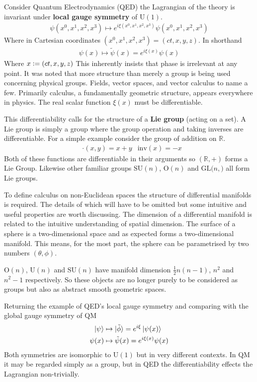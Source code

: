 Consider Quantum Electrodynamics (QED) the Lagrangian of the theory is invariant under \textbf{local gauge symmetry} of $\mathrm{U}(1)$.
\begin{align*}
\psi(x^0,x^1,x^2,x^3) \mapsto e^{i \xi(x^0,x^1,x^2,x^3)} \psi(x^0,x^1,x^2,x^3)
\end{align*}
Where in Cartesian coordinates $(x^0,x^1,x^2,x^3)=(ct,x,y,z)$. In shorthand
\begin{align*}
\psi(x) \mapsto  \tilde{\psi}(x)=e^{i \xi(x)} \psi(x)
\end{align*}
Where $x\vcentcolon=(ct,x,y,z)$ This inherently insists that phase is irrelevant at any point. It was noted that more structure than merely a group is being used  concerning physical groups. Fields, vector spaces, and vector calculus to name a few. Primarily calculus, a fundamentally geometric structure, appears everywhere in physics. The real scalar function $\xi(x)$ must be differentiable.

This differentiability calls for the structure of a \textbf{Lie group} (acting on a set). A Lie group is simply a group where the group operation and taking inverses are differentiable. For a simple example consider the group of addition on $\mathbb{R}$.
\begin{align*}
&\cdot(x,y) = x+y &\mathrm{inv}(x) = -x
\end{align*}
Both of these functions are differentiable in their arguments so $(\mathbb{R},+)$ forms a Lie Group. Likewise other familiar groups $\mathrm{SU}(n)$, $\mathrm{O}(n)$ and $\mathrm{GL}(n,\mathrm)$ all form Lie groups.

To define calculus on non-Euclidean spaces the structure of differential manifolds is required. The details of which will have to be omitted but some intuitive and useful properties are worth discussing. The dimension of a differential manifold is related to the intuitive understanding of spatial dimension. The surface of a sphere is a two-dimensional space and as expected forms a two-dimensional manifold. This means, for the most part, the sphere can be parametrised by two numbers $(\theta,\phi)$.

$\mathrm{O}(n)$, $\mathrm{U}(n)$ and $\mathrm{SU}(n)$ have manifold dimension $\frac{1}{2}n(n-1)$, $n^2$ and $n^2-1$ respectively. So these objects are no longer purely to be considered as groups but also as abstract smooth geometric spaces.

Returning the example of QED's local gauge symmetry and comparing with the global gauge symmetry of QM
\begin{align*}
\ket{\psi} &\mapsto  \ket{\tilde{\phi}}=e^{i \xi} \ket{\psi(x)} \\
\psi(x) &\mapsto  \tilde{\psi}(x)=e^{i \xi(x)} \psi(x)
\end{align*}
Both symmetries are isomorphic to $\mathrm{U}(1)$ but in very different contexts. In QM it may be regarded simply as a group, but in QED the differentiability effects the Lagrangian non-trivially.

